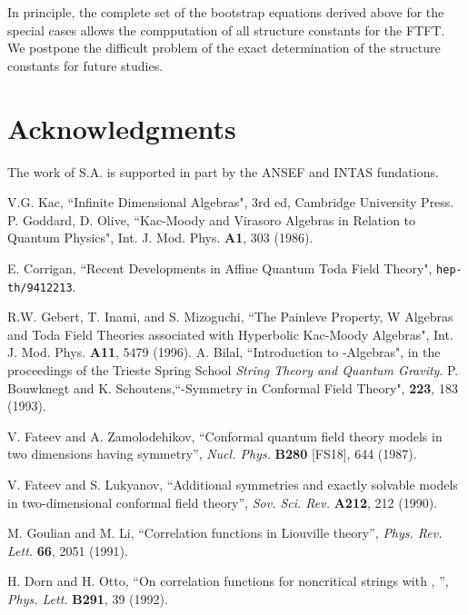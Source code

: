 \documentclass[a4paper,12pt]{article}
\begin{document}
In principle, the complete set of the bootstrap equations derived above for the
special cases \coordHE{} allows
the compputation of  all structure constants for the \coordHE{} FTFT.
We postpone the difficult problem of the exact determination
of the structure constants for future studies.

\section*{Acknowledgments}
The work of S.A. is supported in part by the ANSEF and INTAS
fundations.

\begin{thebibliography}{10}
%
 V.G. Kac, ``Infinite Dimensional Algebras", 3rd ed,
Cambridge University Press.
%
 P. Goddard, D. Olive, ``Kac-Moody and Virasoro Algebras in Relation
to Quantum Physics", Int. J. Mod. Phys. {\bfseries A1}, 303 (1986).

%
 E. Corrigan, ``Recent Developments in Affine Quantum Toda
Field Theory", \texttt{hep-th/9412213}.


%
 R.W. Gebert, T. Inami, and S. Mizoguchi,
``The Painleve Property, W Algebras and Toda Field Theories associated with
Hyperbolic Kac-Moody Algebras",
Int. J. Mod. Phys. {\bfseries A11}, 5479 (1996).
%
 A. Bilal, ``Introduction to \coordHE{}-Algebras",
in the proceedings of the Trieste Spring School 
\textit{String Theory and Quantum Gravity}.
%
 P. Bouwknegt and K. Schoutens,``\coordHE{}-Symmetry in Conformal
Field Theory", {\bfseries 223}, 183 (1993).

%
 V. Fateev and A. Zamolodehikov, ``Conformal quantum field
theory models in two dimensions having \coordHE{} symmetry'', {\it
Nucl. Phys.} {\bf B280} [FS18], 644 (1987).

%
 V. Fateev and S. Lukyanov, ``Additional symmetries and
exactly solvable models in two-dimensional conformal field theory'',
{\it Sov. Sci. Rev.} {\bf A212}, 212 (1990).


%
 M. Goulian and M. Li, ``Correlation functions in 
Liouville theory'', {\it Phys. Rev. Lett.} {\bf 66}, 2051 (1991).


%
 H. Dorn and H. Otto, ``On correlation functions for 
noncritical strings with \coordHE{}, \coordHE{}'', {\it Phys. Lett.}
{\bf B291}, 39 (1992).


\end{thebibliography}
\end{document}
